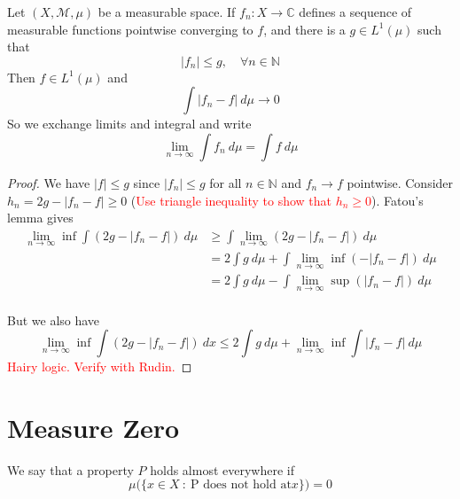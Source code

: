 \begin{theorem}
  Let $(X, \mathcal{M}, \mu)$ be a measurable space. If $f_n: X \to \mathbb{C}$ defines a sequence of measurable functions pointwise converging to $f$, and there is a $g \in L^1(\mu)$ such that \[
      |f_n| \le g, \quad \forall n \in \mathbb{N}
  \]
  Then $f \in L^1(\mu)$ and  \[
      \int |f_n - f| \ d \mu \to 0
  \]
  So we exchange limits and integral and write \[
      \lim_{n \to \infty} \int  f_n \ d \mu = \int f \ d \mu
  \]
\end{theorem}
\begin{proof}
  We have $|f| \le g$ since $|f_n| \le g$ for all $n \in \mathbb{N}$ and $f_n \to f$ pointwise. Consider $h_n = 2g - |f_n - f| \ge 0$ (\textcolor{red}{Use triangle inequality to show that $h_n \ge 0$}). Fatou's lemma gives \begin{align*}
    \lim_{n \to \infty} \inf \int (2g - |f_n - f|) \ d \mu &\ge \int   \lim_{n \to \infty} (2g - |f_n - f|)  \ d \mu \\ 
    &= 2 \int  g \ d \mu + \int \lim_{n \to \infty} \inf (- |f_n - f|) \ d \mu \\ 
    &= 2 \int  g \ d \mu - \int \lim_{n \to \infty} \sup (|f_n - f|) \ d \mu \\ 
  \end{align*}

  But we also have \[
    \lim_{n \to \infty} \inf \int (2g - |f_n - f|) \ dx \le 2 \int g \ d \mu + \lim_{n \to \infty} \inf \int |f_n - f| \ d \mu
  \]
  \textcolor{red}{Hairy logic. Verify with Rudin.}
\end{proof}


\section{Measure Zero}

\begin{definition}
  We say that a property $P$ holds almost everywhere if \[
    \mu \big( \{ x \in X \ : \ \textrm{P does not hold at} x \}\big) = 0
  \]
\end{definition}

